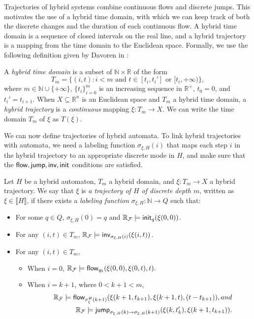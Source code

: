 \documentclass[12pt]{llncs}
\begin{document}
Trajectories of hybrid systems combine continuous flows and discrete jumps. This motivates the use of a hybrid time domain, with which we can keep track of both the discrete changes and the duration of each continuous flow. A hybrid time domain is a sequence of closed intervals on the real line, and a hybrid trajectory is a mapping from the time domain to the Euclidean space. Formally, we use the following definition given by Davoren in \cite{DBLP:conf/hybrid/Davoren09}:
\begin{definition}
A {\em hybrid time domain} is a subset of
 $\mathbb{N}\times \mathbb{R}$ of the form
$$T_m=\{(i, t): i<m \mbox{ and } t\in [t_i, t_i']\mbox{ or }[t_i, +\infty)\},$$
where $m\in \mathbb{N}\cup\{+\infty\}$, $\{t_i\}_{i=0}^m$ is an
increasing sequence in $\mathbb{R}^+$, $t_0= 0$, and $t_i'=t_{i+1}$. When $X\subseteq\mathbb{R}^n$ is an Euclidean space and $T_m$ a hybrid
time domain, a {\em hybrid trajectory} is a {\em continuous} mapping $\xi: T_m\rightarrow X.$ We can write the time domain $T_m$ of $\xi$ as $T(\xi)$.
 \end{definition}
We can now define trajectories of hybrid automata. To link hybrid trajectories with automata, we need a labeling function $\sigma_{\xi,H}(i)$ that maps each step $i$ in the hybrid trajectory to an appropriate discrete mode in $H$, and make sure that the $\mathsf{flow}, \mathsf{jump}, \mathsf{inv}, \mathsf{init}$ conditions are satisfied.
\begin{definition}\label{trajec}
Let $H$ be a hybrid automaton, $T_m$ a hybrid domain, and $\xi: T_m\rightarrow X$ a hybrid trajectory.
We say that $\xi$ is {\em a trajectory of $H$ of discrete depth $m$}, written as $\xi\in \llbracket H \rrbracket$, if there
exists a {\em labeling function} $\sigma_{\xi,H}: \mathbb{N}\rightarrow Q$ such
that:
\begin{itemize}
\item For some $q\in Q$, $\sigma_{\xi,H}(0) = q$ and $\mathbb{R}_{\mathcal{F}}\models \mathsf{init}_{q}(\xi(0,0))$.
\item For any $(i, t)\in T_m$, $\mathbb{R}_{\mathcal{F}}\models \mathsf{inv}_{\sigma_{\xi,H}(i)} (\xi(i,t))$.
\item For any $(i,t)\in T_m$,
\begin{itemize}
\item When $i=0$, $\mathbb{R}_{\mathcal{F}}\models\mathsf{flow}_{q_0}(\xi(0,0), \xi(0,t), t).$
\item When $i = k+1$, where $0<k+1<m$,
\begin{eqnarray*}
& &\mathbb{R}_{\mathcal{F}}\models\mathsf{flow}_{\sigma^H_{\xi}(k+1)}(\xi(k+1, t_{k+1}), \xi(k+1, t), (t - t_{k+1})), and\\
& &\mathbb{R}_{\mathcal{F}}\models \mathsf{jump}_{\sigma_{\xi,H}(k)\rightarrow\sigma_{\xi,H}(k+1)}(\xi(k, t_k'), \xi(k+1,t_{k+1})).
\end{eqnarray*}
\end{itemize}
\end{itemize}
\end{definition}
\end{document}

